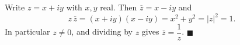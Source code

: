 Write $z=x+iy$ with $x,y$ real. Then $\overline z=x-iy$ and
\[z\,\overline z=(x+iy)(x-iy)=x^2+y^2=|z|^2=1 .\]
In particular $z\ne0$, and dividing by $z$ gives $\overline z=\dfrac{1}{z}$. $\blacksquare$
